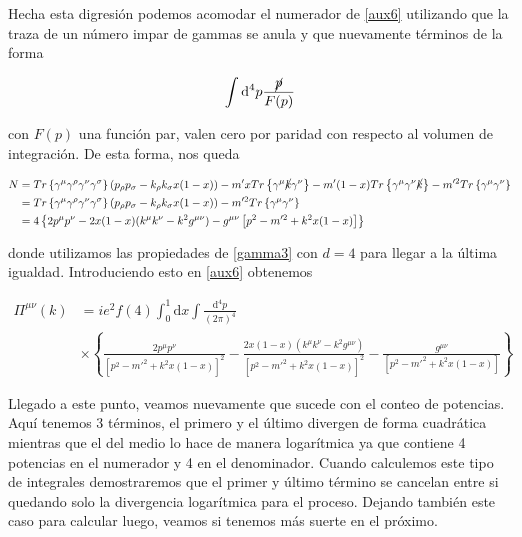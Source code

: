 \documentclass[tickz]{article}
\numberwithin{equation}{section}
\begin{document}
Hecha esta digresión podemos acomodar el numerador de \ref{aux6} utilizando que la traza de un número impar de gammas se anula y que nuevamente términos de la forma 

\begin{equation}\label{key}
\int \mathrm{d^4}p \frac{\cancel{p}}{F(p)}
\end{equation}

con $ F(p) $ una función par, valen cero por paridad con respecto al volumen de integración. De esta forma, nos queda

\begin{equation}\label{key}
\begin{aligned}
N&=Tr\left\{\gamma^{\mu}\gamma^{\rho}\gamma^{\nu}\gamma^{\sigma}\right\} \left(p_{\rho}p_{\sigma} - k_{\rho}k_{\sigma}x(1-x)\right) - m'xTr\left\{\gamma^{\mu}\cancel{k}\gamma^{\nu}\right\} - m'(1-x)Tr\left\{\gamma^{\mu}\gamma^{\nu}\cancel{k}\right\} - m'^2 Tr\left\{\gamma^{\mu}\gamma^{\nu}\right\}\\
&=Tr\left\{\gamma^{\mu}\gamma^{\rho}\gamma^{\nu}\gamma^{\sigma}\right\} \left(p_{\rho}p_{\sigma} - k_{\rho}k_{\sigma}x(1-x)\right) - m'^2 Tr\left\{\gamma^{\mu}\gamma^{\nu}\right\}\\
&= 4\left\{2p^{\mu}p^{\nu}-2x(1-x)(k^{\mu}k^{\nu}-k^2g^{\mu\nu}) - g^{\mu\nu} \left[ p^2 - m'^2 + k^2x(1-x)\right]\right\}
\end{aligned}
\end{equation}

donde utilizamos las propiedades de \ref{gamma3} con $ d=4 $ para llegar a la última igualdad. Introduciendo esto en \ref{aux6} obtenemos


\begin{boxquation}
\begin{equation}\label{pi}
\begin{aligned}
\Pi^{\mu\nu}(k) &= i e^2 f(4) \int_0^1 \mathrm{d}x \int \frac{\mathrm{d^4}p}{(2\pi)^4}\\
&\times \left\{ \frac{2p^{\mu}p^{\nu}}{\left[p^2 -m'^2 + k^2x(1-x)\right]^2} - \frac{2x(1-x)(k^{\mu}k^{\nu}-k^2g^{\mu\nu})}{\left[p^2 -m'^2 + k^2x(1-x)\right]^2}-\frac{g^{\mu\nu}}{\left[ p^2 -m'^2 + k^2x(1-x)\right]} \right\} 
\end{aligned}   
\end{equation}
\end{boxquation}


Llegado a este punto, veamos nuevamente que sucede con el conteo de potencias. Aquí tenemos 3 términos, el primero y el último divergen de forma cuadrática mientras que el del medio lo hace de manera logarítmica ya que contiene 4 potencias en el numerador y 4 en el denominador. Cuando calculemos este tipo de integrales demostraremos que el primer y último término se cancelan entre si quedando solo la divergencia logarítmica para el proceso. Dejando también este caso para calcular luego, veamos si tenemos más suerte en el próximo.
\end{document}
